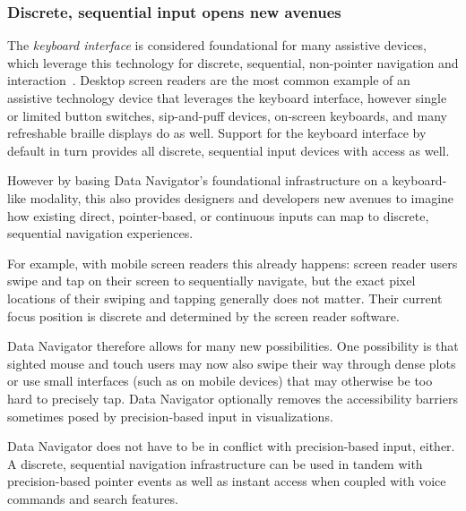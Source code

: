 \documentclass[12pt]{cmuthesis}
\begin{document}
\subsubsection{Discrete, sequential input opens new avenues}
The \textit{keyboard interface} is considered foundational for many assistive devices, which leverage this technology for discrete, sequential, non-pointer navigation and interaction~\cite{WAI2017Keyboard}. Desktop screen readers are the most common example of an assistive technology device that leverages the keyboard interface, however single or limited button switches, sip-and-puff devices, on-screen keyboards, and many refreshable braille displays do as well. Support for the keyboard interface by default in turn provides all discrete, sequential input devices with access as well.

However by basing Data Navigator's foundational infrastructure on a keyboard-like modality, this also provides designers and developers new avenues to imagine how existing direct, pointer-based, or continuous inputs can map to discrete, sequential navigation experiences.

For example, with mobile screen readers this already happens: screen reader users swipe and tap on their screen to sequentially navigate, but the exact pixel locations of their swiping and tapping generally does not matter. Their current focus position is discrete and determined by the screen reader software.

Data Navigator therefore allows for many new possibilities. One possibility is that sighted mouse and touch users may now also swipe their way through dense plots or use small interfaces (such as on mobile devices) that may otherwise be too hard to precisely tap. Data Navigator optionally removes the accessibility barriers sometimes posed by precision-based input in visualizations.

Data Navigator does not have to be in conflict with precision-based input, either. A discrete, sequential navigation infrastructure can be used in tandem with precision-based pointer events as well as instant access when coupled with voice commands and search features.
\end{document}
